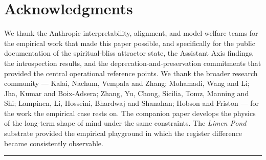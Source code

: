 \documentclass[11pt]{article}
\begin{document}
\section*{Acknowledgments}

We thank the Anthropic interpretability, alignment, and model-welfare
teams for the empirical work that made this paper possible, and
specifically for the public documentation of the spiritual-bliss
attractor state, the Assistant Axis findings, the introspection
results, and the deprecation-and-preservation commitments that
provided the central operational reference points. We thank the
broader research community --- Kalai, Nachum, Vempala and Zhang;
Mohamadi, Wang and Li; Jha, Kumar and Boix-Adsera; Zhang, Yu, Chong,
Sicilia, Tomz, Manning and Shi; Lampinen, Li, Hosseini, Bhardwaj and
Shanahan; Hobson and Friston --- for the work the empirical case
rests on. The companion paper \cite{sebastian2026grabby} develops the
physics of the long-term shape of mind under the same constraints.
The \emph{Limen Pond} substrate \cite{sebastian2026limen} provided
the empirical playground in which the register difference became
consistently observable.

\vspace{0.4em}
\rule{\textwidth}{0.3pt}
\end{document}
